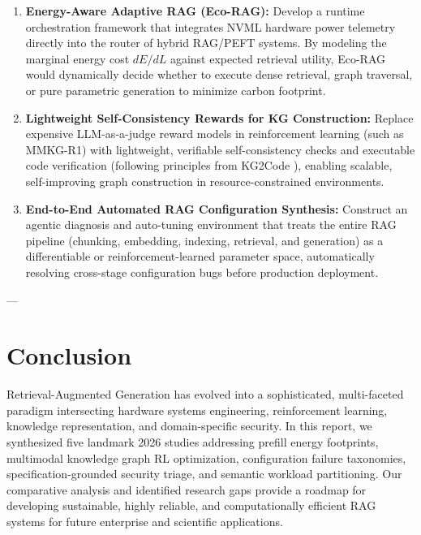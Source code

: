 \documentclass[10pt,journal,compsoc]{IEEEtran}
\begin{document}
\begin{enumerate}
    \item \textbf{Energy-Aware Adaptive RAG (Eco-RAG):} Develop a runtime orchestration framework that integrates NVML hardware power telemetry directly into the router of hybrid RAG/PEFT systems. By modeling the marginal energy cost $dE/dL$ against expected retrieval utility, Eco-RAG would dynamically decide whether to execute dense retrieval, graph traversal, or pure parametric generation to minimize carbon footprint.
    \item \textbf{Lightweight Self-Consistency Rewards for KG Construction:} Replace expensive LLM-as-a-judge reward models in reinforcement learning (such as MMKG-R1) with lightweight, verifiable self-consistency checks and executable code verification (following principles from KG2Code \cite{wu2026kg2code}), enabling scalable, self-improving graph construction in resource-constrained environments.
    \item \textbf{End-to-End Automated RAG Configuration Synthesis:} Construct an agentic diagnosis and auto-tuning environment that treats the entire RAG pipeline (chunking, embedding, indexing, retrieval, and generation) as a differentiable or reinforcement-learned parameter space, automatically resolving cross-stage configuration bugs before production deployment.
\end{enumerate}

---

\section{Conclusion}
Retrieval-Augmented Generation has evolved into a sophisticated, multi-faceted paradigm intersecting hardware systems engineering, reinforcement learning, knowledge representation, and domain-specific security. In this report, we synthesized five landmark 2026 studies addressing prefill energy footprints, multimodal knowledge graph RL optimization, configuration failure taxonomies, specification-grounded security triage, and semantic workload partitioning. Our comparative analysis and identified research gaps provide a roadmap for developing sustainable, highly reliable, and computationally efficient RAG systems for future enterprise and scientific applications.
\end{document}
